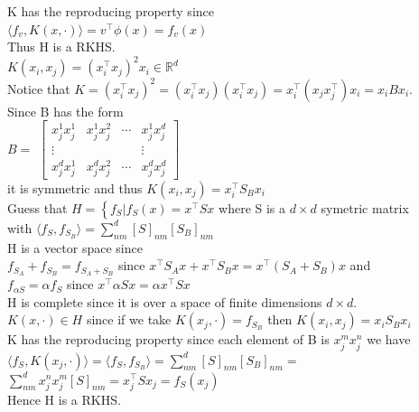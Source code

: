 \documentclass[18pt]{article}
\begin{document}
\begin{flushleft}
K has the reproducing property since\\
\vspace{.4cm}
$\langle f_v,K(x,\cdot)\rangle=v^{\top}\phi(x)=f_v(x)$\\
\vspace{.4cm}
Thus H is a RKHS.\\
\pagebreak
$K(x_i,x_j)=\left(x_i^{\top}x_j\right)^2$\hspace{1cm}$x_i \in\mathbb{R}^d$\\
\vspace{.4cm}
Notice that $K=\left(x_i^{\top}x_j\right)^2=\left(x_i^{\top}x_j\right)\left(x_i^{\top}x_j\right)=x_i^{\top}\left(x_j x_j^{\top}\right)x_i=x_iBx_i$.\\
\vspace{.4cm}
Since B has the form\\
\vspace{.4cm}
\hspace{3cm} $B=$
    ${\begin{bmatrix}
    x_j^1 x_j^1 & x_j^1 x_j^2& \cdots &x_j^1 x_j^d\\
    \vdots&           &                &\vdots\\
    x_j^d x_j^1 & x_j^d x_j^2& \cdots &x_j^d x_j^d
    \end{bmatrix}}$\\
\vspace{.4cm}
it is symmetric and thus $K(x_i,x_j)=x_i^{\top}S_Bx_i$\\
\vspace{.4cm}
Guess that
\vspace{.4cm}
$H=\left\{f_S \Big| f_S(x)=x^{\top}Sx\right.$ where S is a $d \times d$ symetric matrix\\
\hspace{3cm} with $\langle f_S,f_{S_B}\rangle=\sum\limits_{nm}^d [S]_{nm}[S_B]_{nm}$\\
\vspace{.4cm}
H is a vector space since\\
\vspace{.4cm}
$f_{S_A}+f_{S_B}=f_{S_A+S_B}$ since $x^{\top}S_Ax+x^{\top}S_Bx=x^{\top}(S_A+S_B)x$ and\\
$f_{\alpha S}=\alpha f_S$ since $x^{\top}\alpha Sx=\alpha x^{\top} Sx$\\
\vspace{.4cm}
H is complete since it is over a space of finite dimensions $d\times d$.\\
\vspace{.4cm}
$K(x,\cdot) \in H$ since if we take $K(x_j,\cdot)=f_{S_B}$ then $K(x_i,x_j)=x_i S_B x_i$\\
\vspace{.4cm}
K has the reproducing property since each element of B is $x_j^m x_j^n$ we have\\
\vspace{.4cm}
$\langle f_S,K(x_j,\cdot)\rangle=\langle f_S,f_{S_B}\rangle=\sum\limits_{nm}^d [S]_{nm}[S_B]_{nm}=$
$\sum\limits_{nm}^d x_j^n x_j^m [S]_{nm}=x_j^{\top}Sx_j=f_S(x_j)$\\
\vspace{.4cm}
Hence H is a RKHS.
\end{flushleft}
\end{document}
